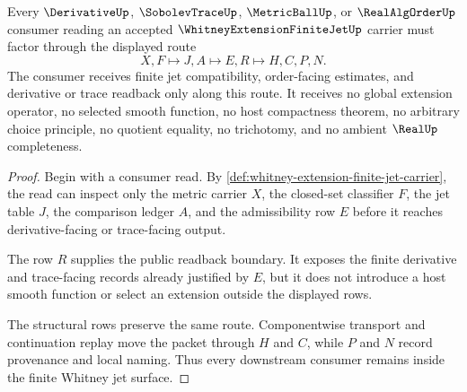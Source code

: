 \begin{theorem}
\label{thm:whitney-extension-finite-jet-consumer-boundary}
Every $\DerivativeUp$, $\SobolevTraceUp$, $\MetricBallUp$, or $\RealAlgOrderUp$ consumer reading an accepted $\WhitneyExtensionFiniteJetUp$ carrier must factor through the displayed route
$$
X,F \longmapsto J,A \longmapsto E,R \longmapsto H,C,P,N .
$$
The consumer receives finite jet compatibility, order-facing estimates, and derivative or trace readback only along this route. It receives no global extension operator, no selected smooth function, no host compactness theorem, no arbitrary choice principle, no quotient equality, no trichotomy, and no ambient $\RealUp$ completeness.
\end{theorem}
\begin{proof}
Begin with a consumer read. By \autoref{def:whitney-extension-finite-jet-carrier}, the read can inspect only the metric carrier $X$, the closed-set classifier $F$, the jet table $J$, the comparison ledger $A$, and the admissibility row $E$ before it reaches derivative-facing or trace-facing output.

The row $R$ supplies the public readback boundary. It exposes the finite derivative and trace-facing records already justified by $E$, but it does not introduce a host smooth function or select an extension outside the displayed rows.

The structural rows preserve the same route. Componentwise transport and continuation replay move the packet through $H$ and $C$, while $P$ and $N$ record provenance and local naming. Thus every downstream consumer remains inside the finite Whitney jet surface.
\end{proof}


\begin{closurestatus}{\WhitneyExtensionFiniteJetUp}
  \theoryclosure{\seedClosure}
  \formalstatus{\unformalizedV}
\end{closurestatus}
